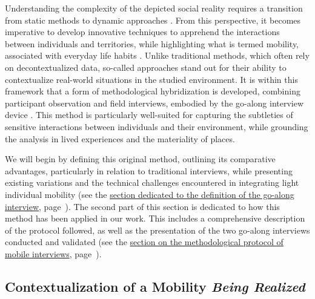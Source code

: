 \begin{refsegment}
Understanding the complexity of the depicted social reality requires a transition from static methods to dynamic approaches \textcolor{blue}{\textcite[207]{sheller_new_2006}}. From this perspective, it becomes imperative to develop innovative techniques to apprehend the interactions between individuals and territories, while highlighting what is termed  mobility, associated with everyday life habits \textcolor{blue}{\autocite[1267-1271]{hein_mobile_2008}}. Unlike traditional methods, which often rely on decontextualized data, so-called  approaches stand out for their ability to contextualize real-world situations in the studied environment. It is within this framework that a form of methodological hybridization is developed, combining participant observation and field interviews, embodied by the go-along interview device \textcolor{blue}{\autocites[84]{thibaud_methode_2001}[3, 5]{despres_replacer_2019}{meissonnier_methodological_2020}}. This method is particularly well-suited for capturing the subtleties of sensitive interactions between individuals and their environment, while grounding the analysis in lived experiences and the materiality of places.%

We will begin by defining this original method, outlining its comparative advantages, particularly in relation to traditional interviews, while presenting existing variations and the technical challenges encountered in integrating light individual mobility (see the \hyperref[chap3:parcours-commente-definition]{section dedicated to the definition of the go-along interview}, page~\pageref{chap3:parcours-commente-definition}). The second part of this section is dedicated to how this method has been applied in our work. This includes a comprehensive description of the protocol followed, as well as the presentation of the two go-along interviews conducted and validated (see the \hyperref[chap3:parcours-commente-administration]{section on the methodological protocol of mobile interviews}, page~\pageref{chap3:parcours-commente-administration}).%

\subsection{Contextualization of a Mobility \textsl{Being Realized}
    \label{chap3:parcours-commente-definition}
    }


\end{refsegment}
